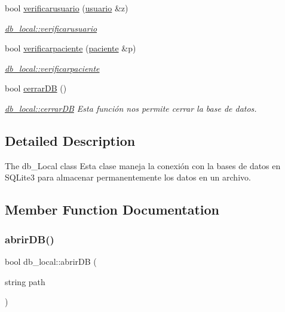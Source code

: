 \begin{DoxyCompactItemize}
bool \hyperlink{classdb__local_a54ef2e3aa44fcfb68f9dd02c64ae8421}{verificarusuario} (\hyperlink{classusuario}{usuario} \&z)
\begin{DoxyCompactList}\small\item\em \hyperlink{classdb__local_a54ef2e3aa44fcfb68f9dd02c64ae8421}{db\+\_\+local\+::verificarusuario} \end{DoxyCompactList}\item 
bool \hyperlink{classdb__local_af39c3f536549485b9ec8e614f92870c1}{verificarpaciente} (\hyperlink{classpaciente}{paciente} \&p)
\begin{DoxyCompactList}\small\item\em \hyperlink{classdb__local_af39c3f536549485b9ec8e614f92870c1}{db\+\_\+local\+::verificarpaciente} \end{DoxyCompactList}\item 
\mbox{\label{classdb__local_a114b03d9bae1bc433d5e3bf5b38885fe}} 
bool \hyperlink{classdb__local_a114b03d9bae1bc433d5e3bf5b38885fe}{cerrar\+DB} ()
\begin{DoxyCompactList}\small\item\em \hyperlink{classdb__local_a114b03d9bae1bc433d5e3bf5b38885fe}{db\+\_\+local\+::cerrar\+DB} Esta función nos permite cerrar la base de datos. \end{DoxyCompactList}\end{DoxyCompactItemize}


\subsection{Detailed Description}
The db\+\_\+\+Local class Esta clase maneja la conexión con la bases de datos en S\+Q\+Lite3 para almacenar permanentemente los datos en un archivo. 

\subsection{Member Function Documentation}
\mbox{\label{classdb__local_a64ad8edee1a11c82f5d96bfd10a5fdd3}} 
\subsubsection{\texorpdfstring{abrir\+D\+B()}{abrirDB()}}
{\footnotesize\ttfamily bool db\+\_\+local\+::abrir\+DB (\begin{DoxyParamCaption}\item[{string}]{path }\end{DoxyParamCaption})}



